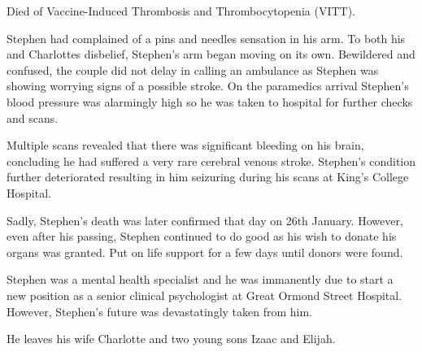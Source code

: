 Died of Vaccine-Induced Thrombosis and Thrombocytopenia (VITT).

Stephen had complained of a pins and needles sensation in his arm. To both his
and Charlottes disbelief, Stephen’s arm began moving on its own. Bewildered and
confused, the couple did not delay in calling an ambulance as Stephen was
showing worrying signs of a possible stroke. On the paramedics arrival Stephen’s
blood pressure was alarmingly high so he was taken to hospital for further
checks and scans.

Multiple scans revealed that there was significant bleeding on his brain,
concluding he had suffered a very rare cerebral venous stroke. Stephen’s
condition further deteriorated resulting in him seizuring during his scans at
King’s College Hospital.

Sadly, Stephen’s death was later confirmed that day on 26th January. However,
even after his passing, Stephen continued to do good as his wish to donate his
organs was granted. Put on life support for a few days until donors were found.

Stephen was a mental health specialist and he was immanently due to start a new
position as a senior clinical psychologist at Great Ormond Street
Hospital. However, Stephen’s future was devastatingly taken from him.

He leaves his wife Charlotte and two young sons Izaac and Elijah.

